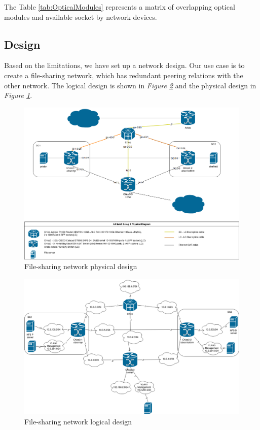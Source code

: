 \documentclass[10pt,a4paper]{article}
\begin{document}
The Table \ref{tab:OpticalModules} represents a matrix of overlapping optical modules and available socket by network devices.

\subsection{Design}
Based on the limitations, we have set up a network design. Our use case is to create a file-sharing network, which has redundant peering relations with the other network. The logical design is shown in \textit{Figure \ref{fig:logical-diagram}} and the physical design in \textit{Figure \ref{fig:physical-diagram}}. 

\begin{figure}[H]
	\centering
		\includegraphics[scale=0.38]{figures/ANLab3Group3PhysicalDia.png}
		\caption{File-sharing network physical design}
	\label{fig:physical-diagram}
\end{figure}

\begin{figure}[H]
	\centering
		\includegraphics[scale=0.38]{figures/ANLab3Group3LogicalDia.png}
		\caption{File-sharing network logical design}
	\label{fig:logical-diagram}
\end{figure}
\end{document}
